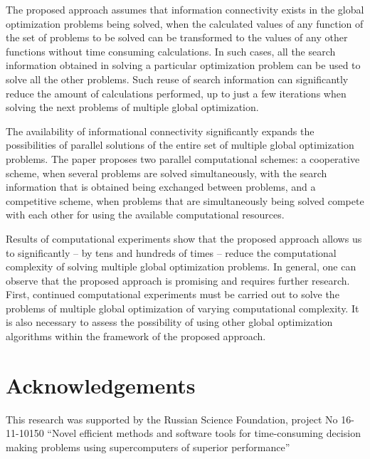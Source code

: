 \documentclass[review]{elsarticle}
\begin{document}
The proposed approach assumes that information connectivity exists in the global optimization problems being solved, when the calculated values of any function of the set of problems to be solved can be transformed to the values of any other functions without time consuming calculations. In such cases, all the search information obtained in solving a particular optimization problem can be used to solve all the other problems. Such reuse of search information can significantly reduce the amount of calculations performed, up to just a few iterations when solving the next problems of multiple global optimization.

The availability of informational connectivity significantly expands the possibilities of parallel solutions of the entire set of multiple global optimization problems. The paper proposes two parallel computational schemes: a cooperative scheme, when several problems are solved simultaneously, with the search information that is obtained being exchanged between problems, and a competitive scheme, when problems that are simultaneously being solved compete with each other for using the available computational resources.

Results of computational experiments show that the proposed approach allows us to significantly -- by tens and hundreds of times -- reduce the computational complexity of solving multiple global optimization problems.
In general, one can observe that the proposed approach is promising and requires further research. First, continued computational experiments must be carried out to solve the problems of multiple global optimization of varying computational complexity. It is also necessary to assess the possibility of using other global optimization algorithms within the framework of the proposed approach.

\section*{Acknowledgements} 
This research was supported by the Russian Science Foundation, project No 16-11-10150 ``Novel efficient methods and software tools for time-consuming decision making problems using supercomputers of superior performance''


\end{document}
